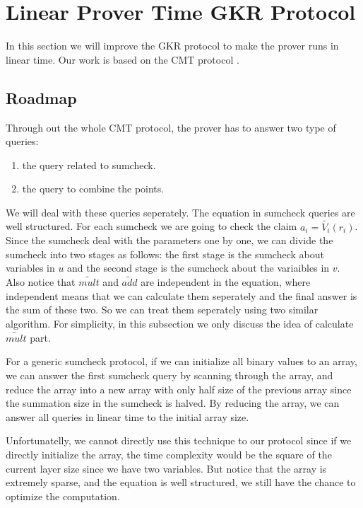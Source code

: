 \section{Linear Prover Time GKR Protocol}
\label{sec::gkrlin}
In this section we will improve the GKR protocol\cite{GKR} to make the prover runs in linear time. Our work is based on the CMT protocol \cite{CMT}.

\subsection{Roadmap}
Through out the whole CMT protocol, the prover has to answer two type of queries:
\begin{enumerate}
	\item the query related to sumcheck.
	\item the query to combine the points. 
\end{enumerate}

We will deal with these queries seperately. The equation in sumcheck queries are well structured. For each sumcheck we are going to check the claim $a_i=\tilde{V_i}(r_i)$. Since the sumcheck deal with the parameters one by one, we can divide the sumcheck into two stages as follows: the first stage is the sumcheck about variables in $u$ and the second stage is the sumcheck about the variaibles in $v$. Also notice that $\tilde{mult}$ and $\tilde{add}$ are independent in the equation, where independent means that we can calculate them seperately and the final answer is the sum of these two. So we can treat them seperately using two similar algorithm. For simplicity, in this subsection we only discuss the idea of calculate $\tilde{mult}$ part. 

For a generic sumcheck protocol, if we can initialize all binary values to an array, we can answer the first sumcheck query by scanning through the array, and reduce the array into a new array with only half size of the previous array since the summation size in the sumcheck is halved. By reducing the array, we can answer all queries in linear time to the initial array size.

Unfortunatelly, we cannot directly use this technique to our protocol since if we directly initialize the array, the time complexity would be the square of the current layer size since we have two variables. But notice that the array is extremely sparse, and the equation is well structured, we still have the chance to optimize the computation.

